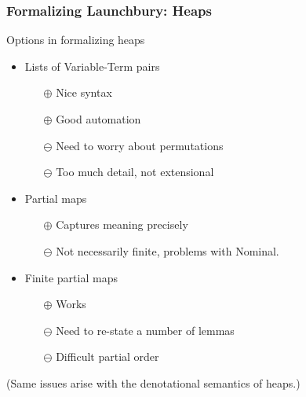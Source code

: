 \documentclass{beamer}
\begin{document}
\begin{frame}
\frametitle{Formalizing Launchbury: Heaps}

Options in formalizing heaps

\begin{itemize}
\item Lists of Variable-Term pairs
\begin{itemize}
\item[$\oplus$] Nice syntax
\item[$\oplus$] Good automation
\item[$\ominus$] Need to worry about permutations
\item[$\ominus$] Too much detail, not extensional
\end{itemize}
\item Partial maps 
\begin{itemize}
\item[$\oplus$] Captures meaning precisely
\item[$\ominus$] Not necessarily finite, problems with Nominal.
\end{itemize}
\item Finite partial maps 
\begin{itemize}
\item[$\oplus$] Works
\item[$\ominus$] Need to re-state a number of lemmas 
\item[$\ominus$] Difficult partial order
\end{itemize}
\end{itemize}

(Same issues arise with the denotational semantics of heaps.)
\end{frame}
\end{document}
